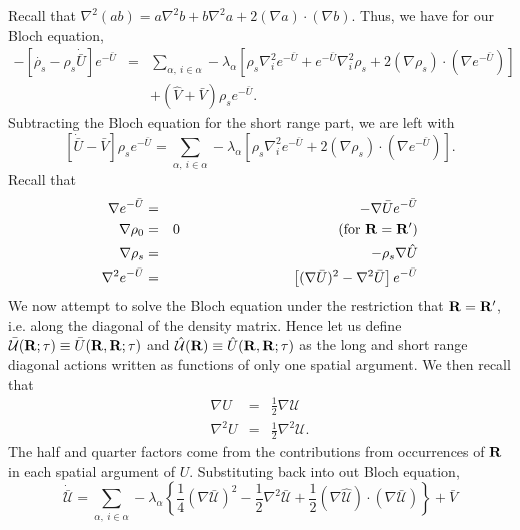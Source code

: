 \documentclass{article}
\begin{document}
Recall that $\nabla^2(ab) = a\nabla^2 b + b\nabla^2a +2(\nabla a)
\cdot (\nabla b)$.  Thus, we have for our Bloch equation,
\begin{eqnarray}
-\left [\dot{\rho_s} -\rho_s\dot{\bar{U}}\right] e^{-\bar{U}} & = &
\sum_{\alpha,\  i\in\alpha} -\lambda_\alpha
\left[\rho_s \nabla^2_i e^{-\bar{U}} + e^{-\bar{U}} \nabla^2_i \rho_s
  + 2(\nabla \rho_s)\cdot (\nabla e^{-\bar{U}}) 
\right] \nonumber \\ & & + (\hat{V} + \bar{V}) \rho_s e^{-\bar{U}}.
\end{eqnarray} 
Subtracting the Bloch equation for the short range part,
we are left with
\begin{equation}
\left[\dot{\bar{U}}-\bar{V}\right] \rho_s e^{-\bar{U}}  = 
\sum_{\alpha,\  i\in\alpha} -\lambda_\alpha
\left[\rho_s \nabla^2_i e^{-\bar{U}}
  + 2(\nabla \rho_s)\cdot (\nabla e^{-\bar{U}}) 
\right].
\end{equation} 
Recall that
\begin{eqnarray}
\nabla e^{-\bar{U}} & = & -\nabla\bar{U}e^{-\bar{U}} \\
\nabla \rho_0 & = & 0 \ \ \ \ \ \ \ \ \ \ \ \ \ \ \ \ \ \ \ \ \ \ \ \
\ \ \ \ \ \ \ \ \ 
\text{ (for $\vR = \vR'$)} \\
\nabla \rho_s & = & -\rho_s \nabla \hat{U} \\
\nabla^2 e^{-\bar{U}} & = & 
\left[(\nabla \bar{U})^2 - \nabla^2 \bar{U}\right] e^{-\bar{U}} \\
\end{eqnarray} 
We now attempt to solve the Bloch equation under the restriction that
$\mathbf{R} = \mathbf{R}'$, i.e. along the diagonal of the density matrix.  Hence
let us define $\bar{\mathcal{U}}(\mathbf{R};\tau) \equiv
\bar{U}(\mathbf{R},\mathbf{R};\tau)$ and $\hat{\mathcal{U}}(\mathbf{R}) \equiv \hat{U}(\mathbf{R},
\mathbf{R};\tau)$ as the long and short range diagonal actions written as
functions of only one spatial argument.  We then recall that
\begin{eqnarray}
\nabla U   & = & \frac{1}{2} \nabla\mathcal{U} \\
\nabla^2 U & = & \frac{1}{2} \nabla^2\mathcal{U}.
\end{eqnarray}
The half and quarter factors come from the contributions from
occurrences of $\mathbf{R}$ in each spatial argument of $U$.  Substituting
back into out Bloch equation,
\begin{equation}
\dot{\bar{\mathcal{U}}} = \sum_{\alpha, \ i\in \alpha} -\lambda_\alpha
\left\{ \frac{1}{4} (\nabla \bar{\mathcal{U}})^2 - 
\frac{1}{2}\nabla^2 \bar{\mathcal{U}} + \frac{1}{2} (\nabla\hat{\mathcal{U}})
  \cdot (\nabla \bar{\mathcal{U}}) \right\} +\bar{V}
\end{equation}
\end{document}
